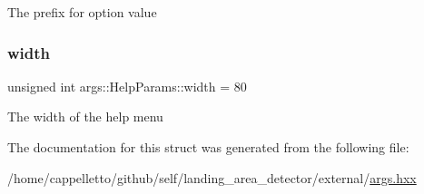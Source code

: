 The prefix for option value \mbox{\label{structargs_1_1_help_params_a24c2d5885e2e16a4d8cacfb5177244e3}} 
\subsubsection{\texorpdfstring{width}{width}}
{\footnotesize\ttfamily unsigned int args\+::\+Help\+Params\+::width = 80}

The width of the help menu 

The documentation for this struct was generated from the following file\+:\begin{DoxyCompactItemize}
\item 
/home/cappelletto/github/self/landing\+\_\+area\+\_\+detector/external/\hyperlink{args_8hxx}{args.\+hxx}\end{DoxyCompactItemize}
